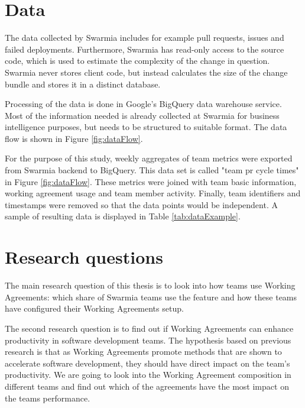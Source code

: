 \section{Data}

The data collected by Swarmia includes for example pull requests, issues and failed deployments. Furthermore, Swarmia has read-only access to the source code, which is used to estimate the complexity of the change in question. Swarmia never stores client code, but instead calculates the size of the change bundle and stores it in a distinct database. 

Processing of the data is done in Google's BigQuery data warehouse service. Most of the information needed is already collected at Swarmia for business intelligence purposes, but needs to be structured to suitable format. The data flow is shown in Figure \ref{fig:dataFlow}.



For the purpose of this study, weekly aggregates of team metrics were exported from Swarmia backend to BigQuery. This data set is called "team pr cycle times" in Figure \ref{fig:dataFlow}. These metrics were joined with team basic information, working agreement usage and team member activity. Finally, team identifiers and timestamps were removed so that the data points would be independent. A sample of resulting data is displayed in Table \ref{tab:dataExample}.




\section{Research questions}

The main research question of this thesis is to look into how teams use Working Agreements: which share of Swarmia teams use the feature and how these teams have configured their Working Agreements setup. 

The second research question is to find out if Working Agreements can enhance productivity in software development teams. The hypothesis based on previous research is that as Working Agreements promote methods that are shown to accelerate software development, they should have direct impact on the team's productivity. We are going to look into the Working Agreement composition in different teams and find out which of the agreements have the most impact on the teams performance. 

